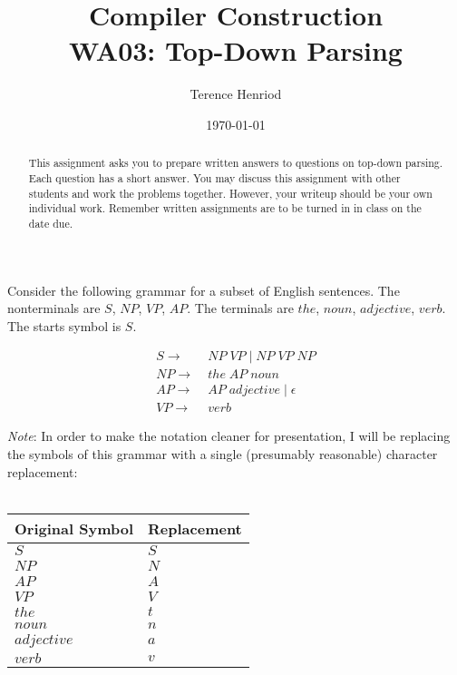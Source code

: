 \documentclass[fleqn]{article}
\title{Compiler Construction \\ WA03: Top-Down Parsing}
\author{Terence Henriod}
\date{\today}
\begin{document}
\clearpage            %
\maketitle            %
\thispagestyle{empty} %

\begin{abstract}
\noindent This assignment asks you to prepare written answers to
questions on top-down parsing. Each question has a short answer. You
may discuss this assignment with other students and work the problems together.
However, your writeup should be your own individual work. Remember written
assignments are to be turned in in class on the date due.
\end{abstract}

\newpage
\noindent Consider the following grammar for a subset of English sentences. The
nonterminals are $S$, $NP$, $VP$, $AP$. The terminals are $the$, $noun$,
$adjective$, $verb$. The starts symbol is $S$.

\begin{align*}
  S  \rightarrow& \; NP \; VP \; | \; NP \; VP \; NP \\
  NP \rightarrow& \; the \; AP \; noun \\
  AP \rightarrow& \; AP \; adjective \; | \; \epsilon \\
  VP \rightarrow& \; verb
\end{align*}

\noindent\textit{Note}: In order to make the notation cleaner for presentation,
I will be replacing the symbols of this grammar with a single
(presumably reasonable) character replacement:\\\\
\begin{tabular}{| l | l |}
  \hline
  Original Symbol & Replacement \\
  \hline
  \hline
  $S$           & $S$       \\
  \hline
  $NP$          & $N$       \\
  \hline
  $AP$          & $A$       \\
  \hline
  $VP$          & $V$       \\
  \hline
  $the$         & $t$       \\
  \hline
  $noun$        & $n$       \\
  \hline
  $adjective$   & $a$       \\
  \hline
  $verb$        & $v$       \\
  \hline
\end{tabular}\\
\end{document}
